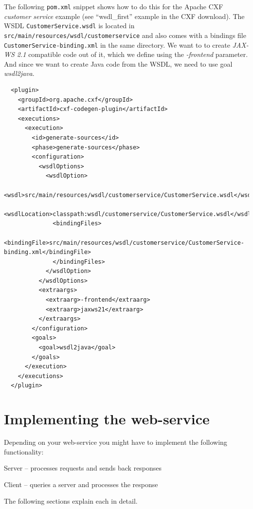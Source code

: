 \documentclass[a4paper]{book}
\begin{document}
The following \texttt{pom.xml} snippet shows how to do this for the Apache
CXF \textit{customer service} example (see ``wsdl\_first'' example in the 
CXF download). The WSDL \texttt{CustomerService.wsdl} is located in 
\texttt{src/main/resources/wsdl/customerservice} and also comes with a 
bindings file \texttt{CustomerService-binding.xml} in the same directory.
We want to to create \textit{JAX-WS 2.1} compatible code out of it, which we
define using the \textit{-frontend} parameter. And since we want to create
Java code from the WSDL, we need to use goal \textit{wsdl2java}.
{\scriptsize
\begin{verbatim}
  <plugin>
    <groupId>org.apache.cxf</groupId>
    <artifactId>cxf-codegen-plugin</artifactId>
    <executions>
      <execution>
        <id>generate-sources</id>
        <phase>generate-sources</phase>
        <configuration>
          <wsdlOptions>
            <wsdlOption>
              <wsdl>src/main/resources/wsdl/customerservice/CustomerService.wsdl</wsdl>
              <wsdlLocation>classpath:wsdl/customerservice/CustomerService.wsdl</wsdlLocation>
              <bindingFiles>
                <bindingFile>src/main/resources/wsdl/customerservice/CustomerService-binding.xml</bindingFile>
              </bindingFiles>
            </wsdlOption>
          </wsdlOptions>
          <extraargs>
            <extraarg>-frontend</extraarg>
            <extraarg>jaxws21</extraarg>
          </extraargs>
        </configuration>
        <goals>
          <goal>wsdl2java</goal>
        </goals>
      </execution>
    </executions>
  </plugin>
\end{verbatim}
}

\section{Implementing the web-service}
Depending on your web-service you might have to implement the following
functionality:
\begin{tight_itemize}
	\item {Server} -- processes requests and sends back responses
	\item {Client} -- queries a server and processes the response
\end{tight_itemize}
The following sections explain each in detail.
\end{document}
